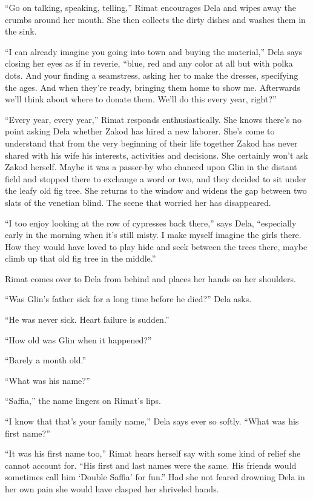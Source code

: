 \documentclass[twoside,11pt,openany]{book}
\begin{document}
``Go on talking, speaking, telling,'' Rimat encourages Dela and wipes away the crumbs around
her mouth. She then collects the dirty dishes and washes them in the sink.

``I can already imagine you going into town and buying the material,'' Dela says closing her
eyes as if in reverie, ``blue, red and any color at all but with polka dots. And your finding a
seamstress, asking her to make the dresses, specifying the ages. And when they're ready, bringing them home to show me.
Afterwards we'll think about where to donate them. We'll do this every year, right?''

``Every year, every year,'' Rimat responds enthusiastically. She knows there's no point
asking Dela whether Zakod has hired a new laborer. She's come to understand that from the very beginning of their life
together Zakod has never shared with his wife his interests, activities and decisions{. }She certainly
won't{ }ask Zakod herself. Maybe it was a passer-by who chanced upon Glin in the distant field and
stopped there to exchange a word or two, and they decided to sit under the{ }leafy old fig tree.  She
returns to the window and widens the gap between two slats of the venetian blind.  The scene that worried her has
disappeared.

``I too enjoy looking at the row of cypresses back there,'' says Dela,
``especially early in the morning when it's still misty. I make myself imagine the girls there. How they
would have loved to play hide and seek between the trees there, maybe climb up that old fig tree in the
middle.''

Rimat comes over to Dela from behind and places her hands on her shoulders.

``Was Glin's father sick for a long time before he died?'' Dela asks.

``He was never sick. Heart failure is sudden.''

``How old was Glin when it happened?''

``Barely a month old.''

``What was his name?''

``Saffia,'' the name lingers on Rimat's lips.

``I know that that's your family name,'' Dela says ever so softly. ``What was his
first name?''

``It was his first name too,'' Rimat hears herself say with some kind of relief she cannot
account for. ``His first and last names were the same. His friends would sometimes call him `Double
Saffia' for fun.''  Had she not feared drowning Dela in her own pain she would have clasped her
shriveled hands.
\end{document}
